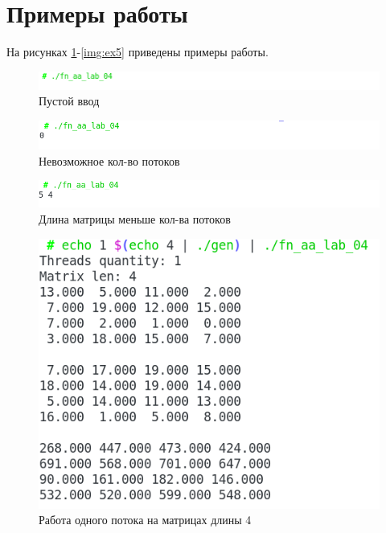 \section{Примеры работы}

На рисунках \ref{img:ex1}-\ref{img:ex5} приведены примеры работы.

\begin{figure}[H]
    \centering
    \includegraphics[scale=0.6]{./images/example1.png}
    \caption{Пустой ввод}
    \label{img:ex1}
\end{figure}

\begin{figure}[H]
    \centering
    \includegraphics[scale=0.6]{./images/example2.png}
    \caption{Невозможное кол-во потоков}
    \label{img:ex2}
\end{figure}

\begin{figure}[H]
    \centering
    \includegraphics[scale=0.6]{./images/example3.png}
    \caption{Длина матрицы меньше кол-ва потоков}
    \label{img:ex3}
\end{figure}

\begin{figure}[H]
    \centering
    \includegraphics[scale=0.6]{./images/example4.png}
    \caption{Работа одного потока на матрицах длины 4}
    \label{img:ex4}
\end{figure}

